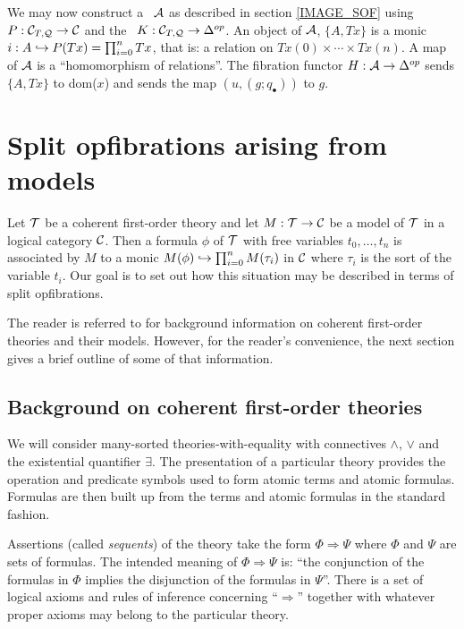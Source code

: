 We may now construct a \SOF\ ${\bf \cal A}$ as described in section 
\ref{IMAGE_SOF} using $P : {{\bf \cal C}}_{T,{\bf \cal Q}} \to {\bf \cal C}$ and the \SOF\ 
$K : {{\bf \cal C}}_{T,{\bf \cal Q}} \to \Delta^{op}$. An object of ${\bf \cal A}$, 
$\{A,Tx\}$ is a monic $i : A \hookrightarrow P(Tx)=\prod_{i=0}^n Tx$, that is: a 
relation on $Tx(0) \times \cdots \times Tx(n)$. A map of ${\bf \cal A}$ is a 
``homomorphism of relations''. The fibration functor $H : {\bf \cal A} \to 
\Delta^{op}$ sends $\{A,Tx\}$ to dom($x$) and sends the map 
$(u,(g;q_\bullet))$ to $g$.

\section{Split opfibrations arising from models} 

Let $\cal T$ be a coherent first-order theory and let $M : \cal T \to 
{\bf \cal C}$ be a model of $\cal T$ in a logical category ${\bf \cal C}$. Then a 
formula $\phi$ of $\cal T$ with free variables $t_0,\ldots,t_n $ is 
associated by $M$ to a monic $M(\phi) \hookrightarrow \prod_{i=0}^n M(\tau_i)$ 
in ${{\bf \cal C}}$ where $\tau_i$ is the sort of the variable $t_i$. Our 
goal is to set out how this situation may be described in terms of 
split opfibrations.

The reader is referred to \cite{MR} for background information on 
coherent first-order theories and their models. However, for the 
reader's convenience, the next section gives a brief outline of some 
of that information.

\subsection{Background on coherent first-order theories} \label{CFOT}
We will consider many-sorted theories-with-equality with connectives 
$\wedge$, $\vee$ and the existential quantifier $\exists$. The 
presentation of a particular theory provides the operation and 
predicate symbols used to form atomic terms and atomic formulas. 
Formulas are then built up from the terms and atomic formulas in the 
standard fashion.

Assertions (called {\em sequents}) of the theory take the form $\Phi 
\Rightarrow \Psi$ where $\Phi$ and $\Psi$ are sets of formulas. The 
intended meaning of $\Phi \Rightarrow \Psi$ is: ``the conjunction of 
the formulas in $\Phi$ implies the disjunction of the formulas in 
$\Psi$''. There is a set of logical axioms and rules of inference 
concerning ``$\Rightarrow$'' together with whatever proper axioms may 
belong to the particular theory.

